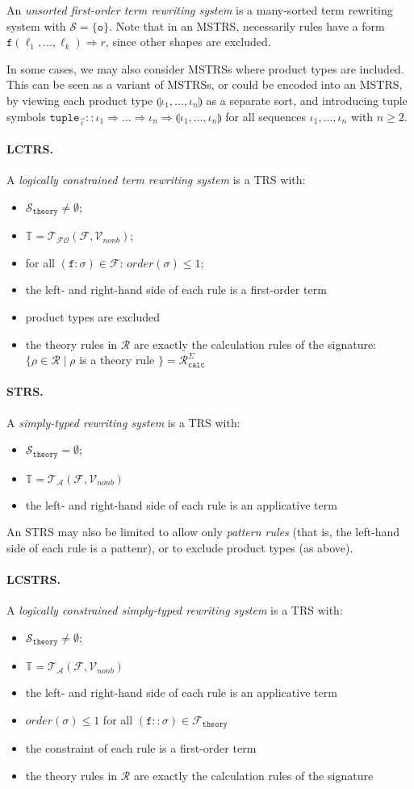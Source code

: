 \documentclass{lmcs}
\theoremstyle{theorem}\newtheorem{theorem}{Theorem}
\theoremstyle{theorem}\newtheorem{lemma}[theorem]{Lemma}
\theoremstyle{theorem}\newtheorem{corollary}[theorem]{Corollary}
\theoremstyle{definition}\newtheorem{definition}[theorem]{Definition}
\theoremstyle{definition}\newtheorem{example}[theorem]{Example}
\newcommand{\F}{\mathcal{F}}
\newcommand{\thF}{\mathcal{F}_{\mathtt{theory}}}
\newcommand{\Vfree}{\mathcal{V}_{\mathit{nonb}}}
\newcommand{\Sorts}{\mathcal{S}}
\newcommand{\thSorts}{\mathcal{S}_{\mathtt{theory}}}
\newcommand{\ATerms}{\mathcal{T}_{\mathcal{A}}}
\newcommand{\FOTerms}{\mathcal{T}_{\mathcal{FO}}}
\newcommand{\Rules}{\mathcal{R}}
\newcommand{\Rulescalc}{\mathcal{R}_{\mathtt{calc}}}
\newcommand{\termsset}{\mathbb{T}}
\newcommand{\order}{\mathit{order}}
\newcommand{\asort}{\iota}
\newcommand{\atype}{\sigma}
\newcommand{\identifier}[1]{\mathtt{#1}}
\newcommand{\afun}{\identifier{f}}
\newcommand{\tuple}[2]{\llparenthesis #1,\dots,#2 \rrparenthesis}
\newcommand{\arrtype}{\Rightarrow}
\newcommand{\arrz}{\Rightarrow}
\newcommand{\symb}[1]{\mathtt{#1}}
\newcommand{\unitsort}{\mathtt{o}}
\newcommand{\myparagraph}[1]{\paragraph{\textbf{#1.}}}
\begin{document}
An \emph{unsorted first-order term rewriting system} is a many-sorted term
rewriting system with $\Sorts = \{ \unitsort \}$.  Note that in an MSTRS,
necessarily rules have a form $\afun(\ell_1,\dots,\ell_k) \arrz r$, since
other shapes are excluded.

In some cases, we may also consider MSTRSs where product types are included.
This can be seen as a variant of MSTRSs, or could be encoded into an MSTRS, by
viewing each product type $\tuple{\asort_1}{\asort_n}$ as a separate sort, and
introducing tuple symbols $\symb{tuple}_{\vec{\asort}} :: \asort_1 \arrtype
\dots \arrtype \asort_n \arrtype \tuple{\asort_1}{\asort_n}$ for all sequences
$\asort_1,\dots,\asort_n$ with $n \geq 2$.

\myparagraph{LCTRS}
A \emph{logically constrained term rewriting system} is a TRS with:
\begin{itemize}
\item $\thSorts \neq \emptyset$;
\item $\termsset = \FOTerms(\F,\Vfree)$;
\item for all $(\afun : \atype) \in \F$: $\order(\atype) \leq 1$;
\item the left- and right-hand side of each rule is a first-order term
\item product types are excluded
\item the theory rules in $\Rules$ are exactly the calculation rules of the
  signature: \\
  $\{ \rho \in \Rules \mid \rho$ is a theory rule $\} = \Rulescalc^\Sigma$
\end{itemize}

\myparagraph{STRS}
A \emph{simply-typed rewriting system} is a TRS with:
\begin{itemize}
\item $\thSorts = \emptyset$;
\item $\termsset = \ATerms(\F,\Vfree)$
\item the left- and right-hand side of each rule is an applicative term
\end{itemize}

An STRS may also be limited to allow only \emph{pattern rules} (that is, the
left-hand side of each rule is a pattenr), or to exclude product types (as
above).

\myparagraph{LCSTRS}
A \emph{logically constrained simply-typed rewriting system} is a TRS with:
\begin{itemize}
\item $\thSorts \neq \emptyset$;
\item $\termsset = \ATerms(\F,\Vfree)$
\item the left- and right-hand side of each rule is an applicative term
\item $\order(\atype) \leq 1$ for all $(\afun :: \atype) \in \thF$
\item the constraint of each rule is a first-order term
\item the theory rules in $\Rules$ are exactly the calculation rules of the
  signature
\end{itemize}
\end{document}

